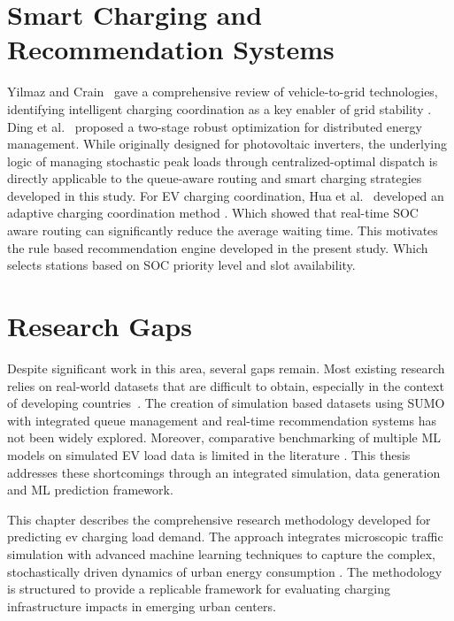\documentclass{thesis-library}
\begin{document}
\section{Smart Charging and Recommendation Systems}

Yilmaz and Crain~\cite{smart_charging2022} gave a comprehensive review of vehicle-to-grid technologies, identifying intelligent charging coordination as a key enabler of grid stability . 
Ding et al.~\cite{queue_management2023} proposed a two-stage robust optimization for distributed energy management. While originally designed for photovoltaic inverters, the underlying logic of managing stochastic peak loads through centralized-optimal dispatch is directly applicable to the queue-aware routing and smart charging strategies developed in this study.
For EV charging coordination, Hua et al.~\cite{hua2014adaptive} developed an adaptive charging coordination method . Which showed that real-time SOC aware routing can significantly reduce the average waiting time. 
This motivates the rule based recommendation engine developed in the present study. Which selects stations based on SOC priority level and slot availability.

\section{Research Gaps}

Despite significant work in this area, several gaps remain. Most existing research relies on real-world datasets that are difficult to obtain, especially in the context of developing countries~\cite{doley2024sustainability}. 
The creation of simulation based  datasets using SUMO with integrated queue management and real-time recommendation systems has not been widely explored.
Moreover, comparative benchmarking of multiple ML models on simulated EV load data is limited in the literature . 
This thesis addresses these shortcomings through an integrated simulation, data generation  and ML prediction framework.


This chapter describes the comprehensive research methodology developed for predicting \Gls{ev} charging load demand. The approach integrates microscopic traffic simulation with advanced machine learning techniques to capture the complex, stochastically driven dynamics of urban energy consumption \cite{sumo2018}. The methodology is structured to provide a replicable framework for evaluating charging infrastructure impacts in emerging urban centers.
\end{document}
